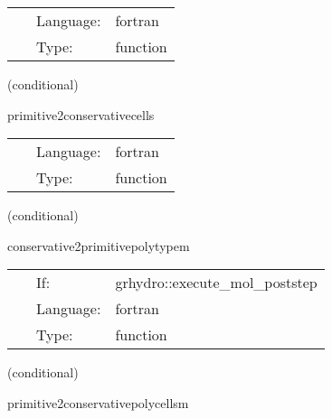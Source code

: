 \hspace{5mm}

 \begin{tabular*}{160mm}{cll} 
~ & Language:  & fortran \\ 
~ & Type:  & function \\ 
\end{tabular*} 


\vspace{5mm}

   (conditional) 

\hspace{5mm} primitive2conservativecells 

\hspace{5mm}{\it convert initial data given in primive variables to conserved variables } 


\hspace{5mm}

 \begin{tabular*}{160mm}{cll} 
~ & Language:  & fortran \\ 
~ & Type:  & function \\ 
\end{tabular*} 


\vspace{5mm}

   (conditional) 

\hspace{5mm} conservative2primitivepolytypem 

\hspace{5mm}{\it convert back to primitive variables (polytype) - mhd version } 


\hspace{5mm}

 \begin{tabular*}{160mm}{cll} 
~ & If:  & grhydro::execute\_mol\_poststep \\ 
~ & Language:  & fortran \\ 
~ & Type:  & function \\ 
\end{tabular*} 


\vspace{5mm}

   (conditional) 

\hspace{5mm} primitive2conservativepolycellsm 

\hspace{5mm}{\it convert initial data given in primive variables to conserved variables - mhd version } 


